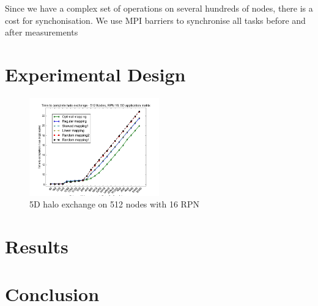 \documentclass[conference,10pt]{IEEEtran}
\begin{document}
Since we have a complex set of operations on several hundreds of nodes, there is a cost for synchonisation.
We use MPI barriers to synchronise all tasks before and after measurements

\section{Experimental Design}

\label{sect:3D Halo plot}
\begin{figure}
  \center
  \includegraphics[width=0.5\textwidth]{5D_512_most_mappings_2.png}
  \caption{5D halo exchange on 512 nodes with 16 RPN}
    \label{fig:3D halo exchange on 512 nodes with 16 RPN}
\end{figure}


\section{Results}

\section{Conclusion}




\end{document}
